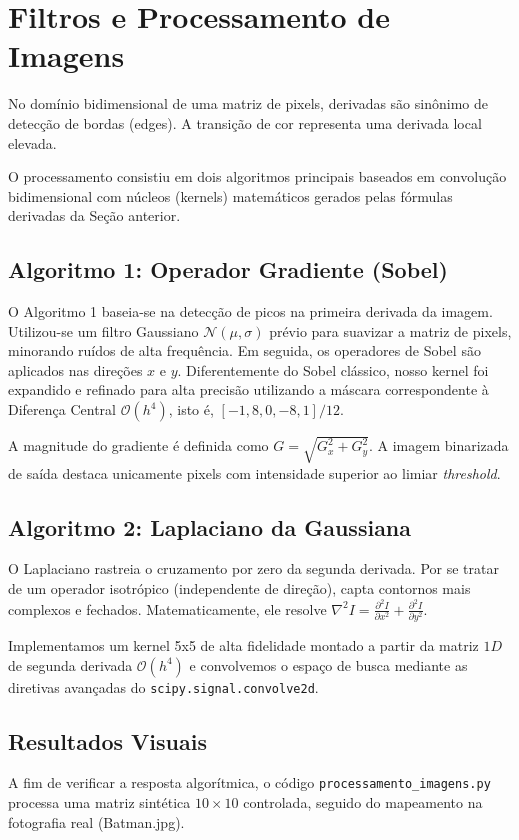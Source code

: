 \documentclass[12pt,a4paper]{article}
\begin{document}
\section{Filtros e Processamento de Imagens}
No domínio bidimensional de uma matriz de pixels, derivadas são sinônimo de detecção de bordas (edges). A transição de cor representa uma derivada local elevada.

O processamento consistiu em dois algoritmos principais baseados em convolução bidimensional com núcleos (kernels) matemáticos gerados pelas fórmulas derivadas da Seção anterior.

\subsection{Algoritmo 1: Operador Gradiente (Sobel)}
O Algoritmo 1 baseia-se na detecção de picos na primeira derivada da imagem. Utilizou-se um filtro Gaussiano $\mathcal{N}(\mu, \sigma)$ prévio para suavizar a matriz de pixels, minorando ruídos de alta frequência. Em seguida, os operadores de Sobel são aplicados nas direções $x$ e $y$.
Diferentemente do Sobel clássico, nosso kernel foi expandido e refinado para alta precisão utilizando a máscara correspondente à Diferença Central $\mathcal{O}(h^4)$, isto é, $[-1, 8, 0, -8, 1]/12$.

A magnitude do gradiente é definida como $G = \sqrt{G_x^2 + G_y^2}$. A imagem binarizada de saída destaca unicamente pixels com intensidade superior ao limiar \textit{threshold}.

\subsection{Algoritmo 2: Laplaciano da Gaussiana}
O Laplaciano rastreia o cruzamento por zero da segunda derivada. Por se tratar de um operador isotrópico (independente de direção), capta contornos mais complexos e fechados. Matematicamente, ele resolve $\nabla^2 I = \frac{\partial^2 I}{\partial x^2} + \frac{\partial^2 I}{\partial y^2}$.

Implementamos um kernel 5x5 de alta fidelidade montado a partir da matriz $1D$ de segunda derivada $\mathcal{O}(h^4)$ e convolvemos o espaço de busca mediante as diretivas avançadas do \texttt{scipy.signal.convolve2d}.

\subsection{Resultados Visuais}
A fim de verificar a resposta algorítmica, o código \texttt{processamento\_imagens.py} processa uma matriz sintética $10 \times 10$ controlada, seguido do mapeamento na fotografia real (Batman.jpg).
\end{document}
